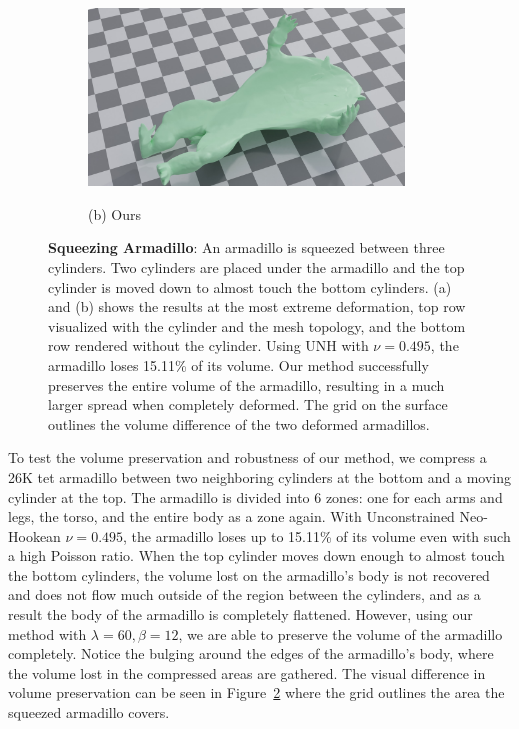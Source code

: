 \begin{figure}
\begin{subfigure}{.49\linewidth}
		\centering
		{\includegraphics[width=3.3in]{images/armadillo/vc.jpg}}
		\caption*{(b) Ours}
		\label{sfig:armadillo_ours}
	\end{subfigure}
	\caption{\textbf{Squeezing Armadillo}: An armadillo is squeezed between three cylinders. Two cylinders are placed under the armadillo and the top cylinder is moved down to almost touch the bottom cylinders. (a) and (b) shows the results at the most extreme deformation, top row visualized with the cylinder and the mesh topology, and the bottom row rendered without the cylinder. Using UNH with $\nu = 0.495$, the armadillo loses 15.11\% of its volume. Our method successfully preserves the entire volume of the armadillo, resulting in a much larger spread when completely deformed. The grid on the surface outlines the volume difference of the two deformed armadillos. }
	\label{fig:armadillo}
\end{figure}

To test the volume preservation and robustness of our method, we compress a 26K tet armadillo between two neighboring cylinders at the bottom and a moving cylinder at the top. The armadillo is divided into 6 zones: one for each arms and legs, the torso, and the entire body as a zone again. With Unconstrained Neo-Hookean $\nu = 0.495$, the armadillo loses up to 15.11\% of its volume even with such a high Poisson ratio. When the top cylinder moves down enough to almost touch the bottom cylinders, the volume lost on the armadillo's body is not recovered and does not flow much outside of the region between the cylinders, and as a result the body of the armadillo is completely flattened. However, using our method with $\lambda = 60, \beta = 12$, we are able to preserve the volume of the armadillo completely. Notice the bulging around the edges of the armadillo's body, where the volume lost in the compressed areas are gathered. The visual difference in volume preservation can be seen in Figure~\ref{fig:armadillo} where the grid outlines the area the squeezed armadillo covers.

